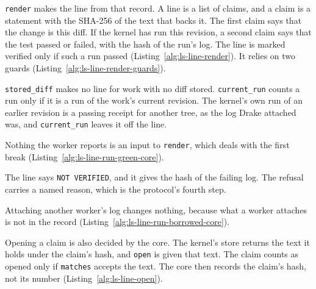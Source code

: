 \texttt{render} makes the line from that record. A line is a list of
claims, and a claim is a statement with the SHA-256 of the text that backs
it. The first claim says that the change is this diff. If the kernel has
run this revision, a second claim says that the test passed or failed,
with the hash of the run's log. The line is marked verified only if such a
run passed (Listing~\ref{alg:ls-line-render}). It relies on two guards
(Listing~\ref{alg:ls-line-render-guards}).



\texttt{stored\_diff} makes no line for work with no diff stored.
\texttt{current\_run} counts a run only if it is a run of the work's
current revision. The kernel's own run of an earlier revision is a passing
receipt for another tree, as the log Drake attached was, and
\texttt{current\_run} leaves it off the line.

Nothing the worker reports is an input to \texttt{render}, which deals
with the first break (Listing~\ref{alg:ls-line-run-green-core}).


The line says \texttt{NOT VERIFIED}, and it gives the hash of the failing
log. The refusal carries a named reason, which is the protocol's fourth
step.

Attaching another worker's log changes nothing, because what a worker
attaches is not in the record
(Listing~\ref{alg:ls-line-run-borrowed-core}).


Opening a claim is also decided by the core. The kernel's store returns
the text it holds under the claim's hash, and \texttt{open} is given that
text. The claim counts as opened only if \texttt{matches} accepts the
text. The core then records the claim's hash, not its number
(Listing~\ref{alg:ls-line-open}).

